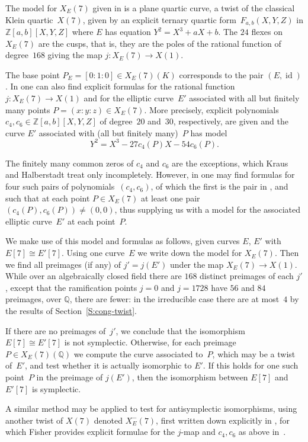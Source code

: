 \documentclass[twoside,leqno,symbols-for-thanks, draft]{rmi}
\numberwithin{equation}{section}
\newcommand{\Q}{\mathbb{Q}}
\newcommand{\Z}{\mathbb{Z}}
\DeclareMathOperator{\id}{id}
\theoremstyle{remark}
\begin{document}
The model for $X_E(7)$ given in \cite{Halberstadt-Kraus-XE7} is a
plane quartic curve, a twist of the classical Klein quartic~$X(7)$,
given by an explicit ternary quartic form~$F_{a,b}(X,Y,Z)$ in
$\Z[a,b][X,Y,Z]$ where $E$ has equation $Y^2=X^3+aX+b$.  The $24$
flexes on $X_E(7)$ are the cusps, that is, they are the poles of the
rational function of degree~$168$ giving the map $j:X_E(7)\to
X(1)$.

The base point $P_E=[0:1:0]\in X_E(7)(K)$ corresponds to the pair
$(E,\id)$.  In \cite{Halberstadt-Kraus-XE7} one can also find explicit formulas
for the rational function $j:X_E(7)\to X(1)$ and for the elliptic curve~$E'$
associated with all 
but finitely many points $P=(x:y:z)\in
X_E(7)$. More precisely, 
explicit polynomials $c_4, c_6 \in \Z[a,b][X,Y,Z]$
of degree~$20$ and~$30$, respectively, are given and the curve $E'$ associated with (all but finitely many)~$P$ has model
\[Y^2=X^3-27c_4(P)X-54c_6(P).\]

The finitely many common zeros of $c_4$
and $c_6$ are the exceptions, which Kraus and Halberstadt treat only
incompletely.  However, in \cite{Fisher} one may find formulas for
four such pairs of polynomials~$(c_4,c_6)$, of which the first is the pair in
\cite{Halberstadt-Kraus-XE7}, and such that at each point $P\in
X_E(7)$ at least one pair $(c_4(P),c_6(P))\not=(0,0)$, thus supplying
us with a model for the associated elliptic 
curve~$E'$ at each point~$P$.

We make use of this model and formulas as follows, given curves $E$,
$E'$ with $E[7]\cong E'[7]$.  Using one curve~$E$ we write down the
model for $X_E(7)$.  Then we find all preimages (if any) of $j'=j(E')$
under the map $X_E(7)\to X(1)$.  While over an algebraically closed
field there are $168$ distinct preimages of each $j'$, except that the
ramification points $j=0$ and $j=1728$ have $56$ and $84$ preimages,
over $\Q$, there are fewer: in the irreducible case there are at
most~$4$ by the results of Section~\ref{S:cong-twist}.

If there are no preimages of~$j'$, we conclude that the isomorphism
$E[7]\cong E'[7]$ is not symplectic.  Otherwise, for each preimage
$P\in X_E(7)(\Q)$ we compute the curve associated to~$P$, which may be
a twist of~$E'$, and test whether it is actually isomorphic to $E'$.
If this holds for one such point~$P$ in the preimage of $j(E')$, then
the isomorphism between $E[7]$ and $E'[7]$ is symplectic.

A similar method may be applied to test for antisymplectic
isomorphisms, using another twist of $X(7)$ denoted $X_E^-(7)$, first
written down explicitly in \cite{PSS}, for which Fisher provides
explicit formulae for the $j$-map and $c_4,c_6$ as above
in~\cite{Fisher}.
\end{document}
